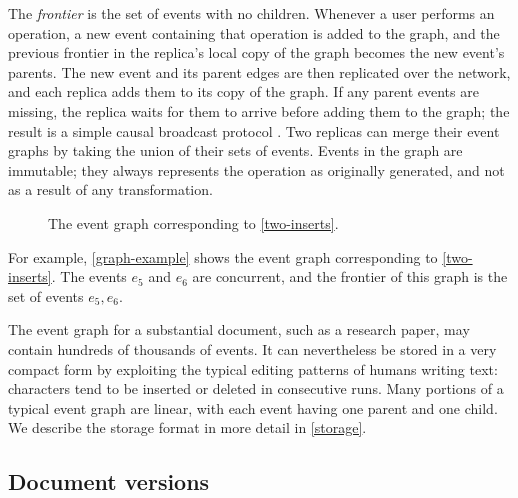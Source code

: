 \documentclass[sigplan,10pt]{acmart}
\begin{document}
The \emph{frontier} is the set of events with no children.
Whenever a user performs an operation, a new event containing that operation is added to the graph, and the previous frontier in the replica's local copy of the graph becomes the new event's parents.
The new event and its parent edges are then replicated over the network, and each replica adds them to its copy of the graph.
If any parent events are missing, the replica waits for them to arrive before adding them to the graph; the result is a simple causal broadcast protocol \cite{Birman1991,Cachin2011}.
Two replicas can merge their event graphs by taking the union of their sets of events.
Events in the graph are immutable; they always represents the operation as originally generated, and not as a result of any transformation.

\begin{figure}
  \caption{The event graph corresponding to \autoref{two-inserts}.}
  \label{graph-example}
\end{figure}

For example, \autoref{graph-example} shows the event graph corresponding to \autoref{two-inserts}.
The events $e_5$ and $e_6$ are concurrent, and the frontier of this graph is the set of events ${e_5, e_6}$.

The event graph for a substantial document, such as a research paper, may contain hundreds of thousands of events.
It can nevertheless be stored in a very compact form by exploiting the typical editing patterns of humans writing text: characters tend to be inserted or deleted in consecutive runs.
Many portions of a typical event graph are linear, with each event having one parent and one child.
We describe the storage format in more detail in \autoref{storage}.

\subsection{Document versions}\label{versions}
\end{document}
